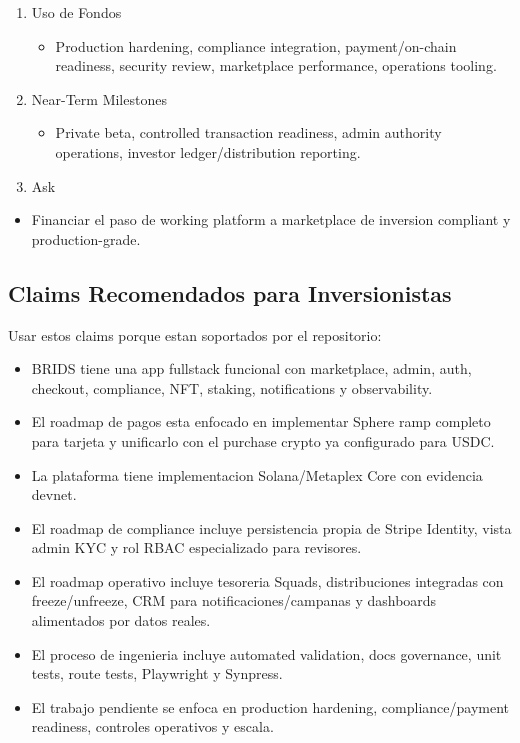 \documentclass[
  10pt,
  letterpaper,
]{article}
\providecommand{\tightlist}{%
  \setlength{\itemsep}{0pt}\setlength{\parskip}{0pt}}
\begin{document}
\begin{enumerate}
  \begin{itemize}
  \tightlist
  \item
    Demo readiness, production foundation, regulated transaction
    readiness, growth and scale.
  \end{itemize}
\item
  Uso de Fondos

  \begin{itemize}
  \tightlist
  \item
    Production hardening, compliance integration, payment/on-chain
    readiness, security review, marketplace performance, operations
    tooling.
  \end{itemize}
\item
  Near-Term Milestones

  \begin{itemize}
  \tightlist
  \item
    Private beta, controlled transaction readiness, admin authority
    operations, investor ledger/distribution reporting.
  \end{itemize}
\item
  Ask
\end{enumerate}

\begin{itemize}
\tightlist
\item
  Financiar el paso de working platform a marketplace de inversion
  compliant y production-grade.
\end{itemize}

\subsection{Claims Recomendados para
Inversionistas}\label{claims-recomendados-para-inversionistas}

Usar estos claims porque estan soportados por el repositorio:

\begin{itemize}
\tightlist
\item
  BRIDS tiene una app fullstack funcional con marketplace, admin, auth,
  checkout, compliance, NFT, staking, notifications y observability.
\item
  El roadmap de pagos esta enfocado en implementar Sphere ramp completo
  para tarjeta y unificarlo con el purchase crypto ya configurado para
  USDC.
\item
  La plataforma tiene implementacion Solana/Metaplex Core con evidencia
  devnet.
\item
  El roadmap de compliance incluye persistencia propia de Stripe
  Identity, vista admin KYC y rol RBAC especializado para revisores.
\item
  El roadmap operativo incluye tesoreria Squads, distribuciones
  integradas con freeze/unfreeze, CRM para notificaciones/campanas y
  dashboards alimentados por datos reales.
\item
  El proceso de ingenieria incluye automated validation, docs
  governance, unit tests, route tests, Playwright y Synpress.
\item
  El trabajo pendiente se enfoca en production hardening,
  compliance/payment readiness, controles operativos y escala.
\end{itemize}
\end{document}
